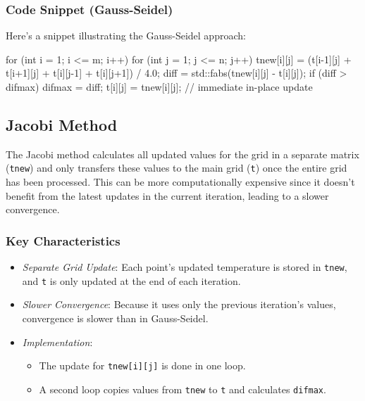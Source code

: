 \documentclass[11pt,a4paper]{article}
\begin{document}
\subsubsection{Code Snippet (Gauss-Seidel)}

Here's a snippet illustrating the Gauss-Seidel approach:

\begin{VerbatimWrap}
for (int i = 1; i <= m; i++) {
  for (int j = 1; j <= n; j++) {
      tnew[i][j] = (t[i-1][j] + t[i+1][j] + t[i][j-1] + t[i][j+1]) / 4.0;
      diff = std::fabs(tnew[i][j] - t[i][j]);
      if (diff > difmax) {
          difmax = diff;
      }
      t[i][j] = tnew[i][j]; // immediate in-place update
  }
}  
\end{VerbatimWrap}

\subsection{Jacobi Method}

The Jacobi method calculates all updated values for the grid in a
separate matrix (\texttt{tnew}) and only transfers these values to the
main grid (\texttt{t}) once the entire grid has been processed. 
This can be more computationally expensive since it doesn't benefit from the latest updates in the current iteration, leading to a slower
convergence.

\subsubsection{Key Characteristics}

\begin{itemize}
\item
  \emph{Separate Grid Update}: 
  Each point's updated temperature is
  stored in \texttt{tnew}, and \texttt{t} is only updated at the end  of each iteration.
\item
  \emph{Slower Convergence}: 
  Because it uses only the previous iteration's values, 
  convergence is slower than in Gauss-Seidel.
\item
  \emph{Implementation}:
  \begin{itemize}
  \item
    The update for \texttt{tnew[i][j]} is done in one loop.
  \item
    A second loop copies values from \texttt{tnew} to \texttt{t} and
    calculates \texttt{difmax}.
  \end{itemize}
\end{itemize}
\end{document}
